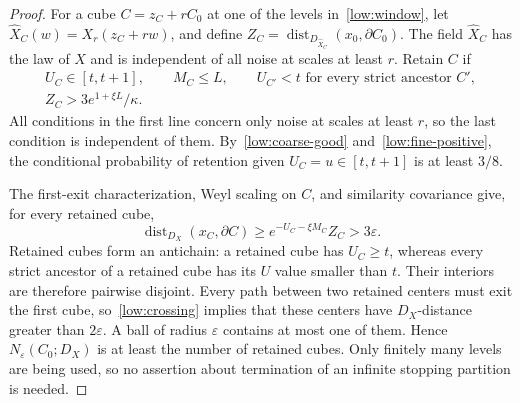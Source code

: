 \documentclass[11pt,letterpaper]{article}
\newcommand{\eps}{\varepsilon}
\DeclareMathOperator{\dist}{dist}
\theoremstyle{definition}
\theoremstyle{remark}
\numberwithin{equation}{section}
\begin{document}
\begin{proof}
For a cube $C=z_C+rC_0$ at one of the levels in~\eqref{low:window}, let $\widehat X_C(w)=X_r(z_C+rw)$, and define $Z_C=\dist_{D_{\widehat X_C}}(x_0,\partial C_0)$. The field $\widehat X_C$ has the law of $X$ and is independent of all noise at scales at least $r$. Retain $C$ if
\begin{equation}\label{low:retain}
 \begin{gathered}
 U_C\in[t,t+1],\qquad M_C\le L,\qquad
 U_{C'}<t\text{ for every strict ancestor }C',\\
 Z_C>3e^{1+\xi L}/\kappa.
 \end{gathered}
\end{equation}
All conditions in the first line concern only noise at scales at least $r$, so the last condition is independent of them. By~\eqref{low:coarse-good} and~\eqref{low:fine-positive}, the conditional probability of retention given $U_C=u\in[t,t+1]$ is at least $3/8$.

The first-exit characterization, Weyl scaling on $C$, and similarity covariance give, for every retained cube,
\begin{equation}\label{low:crossing}
 \dist_{D_X}(x_C,\partial C)
       \ge e^{-U_C-\xi M_C}Z_C>3\eps.
\end{equation}
Retained cubes form an antichain: a retained cube has $U_C\ge t$, whereas every strict ancestor of a retained cube has its $U$ value smaller than $t$. Their interiors are therefore pairwise disjoint. Every path between two retained centers must exit the first cube, so~\eqref{low:crossing} implies that these centers have $D_X$-distance greater than $2\eps$. A ball of radius $\eps$ contains at most one of them. Hence $N_\eps(C_0;D_X)$ is at least the number of retained cubes. Only finitely many levels are being used, so no assertion about termination of an infinite stopping partition is needed.


\end{proof}
\end{document}
